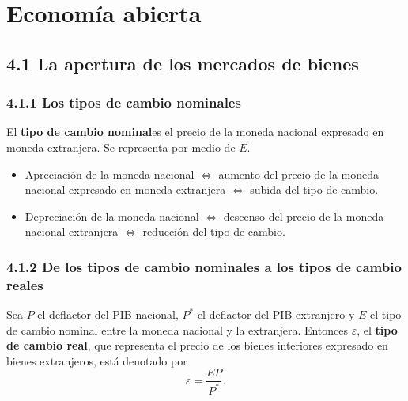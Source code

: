 \documentclass[10pt]{article}
\begin{document}
\begin{multicols*}{2}
\begin{center}
\end{center}

\section{Economía abierta}

\subsection{4.1 La apertura de los mercados de bienes}
\subsubsection{4.1.1 Los tipos de cambio nominales}
El \textbf{tipo de cambio nominal}es el precio de la moneda nacional expresado en moneda extranjera. Se representa por medio de $E$.

\begin{itemize}
    \item Apreciación de la moneda nacional $\iff$ aumento del precio de la moneda nacional expresado en moneda extranjera $\iff$ subida del tipo de cambio.
    \item Depreciación de la moneda nacional $\iff$ descenso del precio de la moneda nacional extranjera $\iff$ reducción del tipo de cambio.
\end{itemize}

\subsubsection{4.1.2 De los tipos de cambio nominales a  los tipos de cambio reales}
Sea $P$ el deflactor del PIB nacional, $P^*$ el deflactor del PIB extranjero y $E$ el tipo de cambio nominal entre la moneda nacional y la extranjera. Entonces $\varepsilon$, el \textbf{tipo de cambio real}, que representa el precio de los bienes interiores expresado en bienes extranjeros, está denotado por
$$ \varepsilon = \frac{EP}{P^*}. $$


\end{multicols*}
\end{document}
